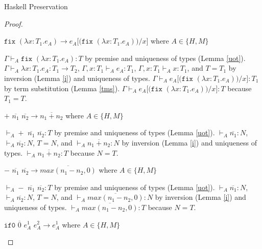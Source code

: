 \begin{theorem}{Haskell Preservation}
\begin{proof}

\begin{case}{\osfix}

$\mathtt{fix}$ $(\lambda x:T_{1}.e_{A})\rightarrow e_{A}[(\mathtt{fix}$ $(\lambda x:T_{1}.e_{A}))/x]$ where $A\in\lbrace H,M\rbrace$

$\Gamma\vdash_{A}\mathtt{fix}$ $(\lambda x:T_{1}.e_{A}):T$ by premise and uniqueness of types (Lemma \ref{uot}).  $\Gamma\vdash_{A}\lambda x:T_{1}.e_{A}:T_{1}\rightarrow T_{2}$, $\Gamma,x:T_{1}\vdash_{A}e_{A}:T_{1}$, $\Gamma,x:T_{1}\vdash_{A}x:T_{1}$, and $T=T_{1}$ by inversion (Lemma \ref{i}) and uniqueness of types.  $\Gamma\vdash_{A}e_{A}[(\mathtt{fix}$ $(\lambda x:T_{1}.e_{A}))/x]:T_{1}$ by term substitution (Lemma \ref{tms}).  $\Gamma\vdash_{A}e_{A}[(\mathtt{fix}$ $(\lambda x:T_{1}.e_{A}))/x]:T$ because $T_{1}=T$.
\end{case}


\begin{case}{\osadd}
$+$ $\overline{n_{1}}$ $\overline{n_{2}}\rightarrow\overline{n_{1}+n_{2}}$ where $A\in\lbrace H,M\rbrace$

$\vdash_{A}+$ $\overline{n_{1}}$ $\overline{n_{2}}:T$ by premise and uniqueness of types (Lemma \ref{uot}).  $\vdash_{A}\overline{n_{1}}:N$, $\vdash_{A}\overline{n_{2}}:N$, $T=N$, and $\vdash_{A}\overline{n_{1}+n_{2}}:N$ by inversion (Lemma \ref{i}) and uniqueness of types.  $\vdash_{A}\overline{n_{1}+n_{2}}:T$ because $N=T$.
\end{case}


\begin{case}{\ossub}
$-$ $\overline{n_{1}}$ $\overline{n_{2}}\rightarrow\overline{max(n_{1}-n_{2},0)}$ where $A\in\lbrace H,M\rbrace$

$\vdash_{A}-$ $\overline{n_{1}}$ $\overline{n_{2}}:T$ by premise and uniqueness of types (Lemma \ref{uot}).  $\vdash_{A}\overline{n_{1}}:N$, $\vdash_{A}\overline{n_{2}}:N$, $T=N$, and $\vdash_{A}\overline{max(n_{1}-n_{2},0)}:N$ by inversion (Lemma \ref{i}) and uniqueness of types.  $\vdash_{A}\overline{max(n_{1}-n_{2},0)}:T$ because $N=T$.
\end{case}


\begin{case}{\osiftrue}

$\mathtt{if0}$ $\overline{0}$ $e_{A}^{1}$ $e_{A}^{2}\rightarrow e_{A}^{1}$ where $A\in\lbrace H,M\rbrace$


\end{case}
\end{proof}
\end{theorem}
